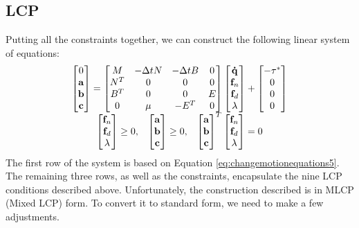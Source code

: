 \subsection{LCP}
Putting all the constraints together, we can construct the following linear system of equations:
\begin{equation}
\label{eq:bigsystem}
\begin{array}{cc}
\left[\begin{matrix}0 \\\mathbf{a} \\ \mathbf{b} \\ \mathbf{c} \end{matrix}\right] =
\left[\begin{matrix}M & -\Delta t N & -\Delta t B & 0 \\ N^T & 0 & 0 & 0 \\ B^T & 0 & 0 & E \\ 0 & \mu & -E^T & 0\end{matrix}\right]\left[\begin{matrix}\mathbf{\dot{\mathbf{q}}} \\ \mathbf{f}_n \\ \mathbf{f}_d \\ \lambda\end{matrix}\right] + \left[\begin{matrix}-\tau^* \\ 0 \\ 0 \\0\end{matrix}\right] \\
\begin{matrix}
\left[\begin{matrix}\mathbf{f}_n \\ \mathbf{f}_d \\ \lambda\end{matrix}\right] \geq 0, & 
\left[\begin{matrix}\mathbf{a} \\ \mathbf{b} \\ \mathbf{c}\end{matrix}\right] \geq 0, &
\left[\begin{matrix}\mathbf{a} \\ \mathbf{b} \\ \mathbf{c}\end{matrix}\right]^T\left[\begin{matrix}\mathbf{f}_n \\ \mathbf{f}_d \\ \lambda\end{matrix}\right] = 0
\end{matrix}
\end{array}
\end{equation}
The first row of the system is based on Equation
\ref{eq:changemotionequations5}. The remaining three rows, as well as
the constraints, encapsulate the nine LCP conditions described
above. Unfortunately, the construction described is in MLCP (Mixed
LCP) form. To convert it to standard form, we need to make a few
adjustments.


